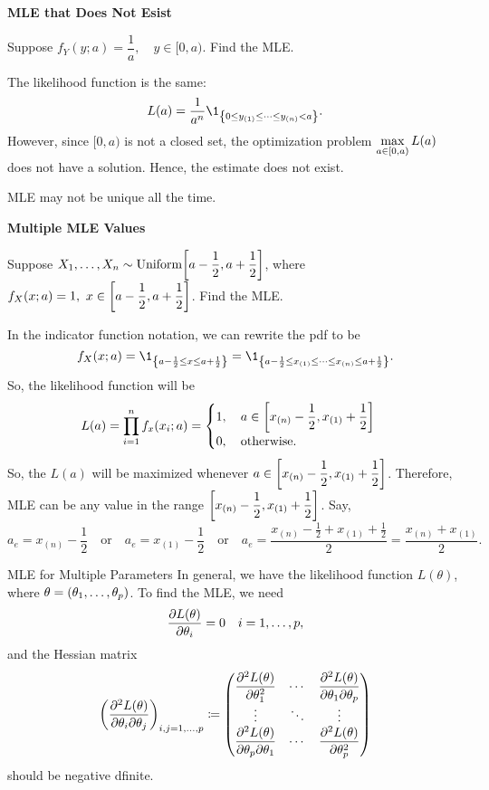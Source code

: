 \begin{eg}
	\textbf{MLE that Does Not Esist}
	\par Suppose $f_Y(y;a)=\dfrac{1}{a},\quad y\in[0, a)$. Find the MLE.
	\begin{sol}
		The likelihood function is the same: \[L(a)=\dfrac{1}{a^n}\1_{\qty{0\leq y_{(1)}\leq\cdots\leq y_{(n)}<a}}.\] However, since $[0,a)$ is not a closed set, the optimization problem $\displaystyle\max_{a\in[0,a)}L(a)$ does not have a solution. Hence, the estimate does not exist. 
	\end{sol}
\end{eg}
\begin{rmk}
	MLE may not be unique all the time.	
\end{rmk}
\begin{eg}
	\textbf{Multiple MLE Values}
	\par Suppose  $X_1,\dots,X_n\sim\text{Uniform}\qty[a-\dfrac{1}{2},a+\dfrac{1}{2}]$, where $f_X(x;a)=1,\ x\in\qty[a-\dfrac{1}{2}, a+\dfrac{1}{2}]$. Find the MLE. 
	\begin{sol}
		In the indicator function notation, we can rewrite the pdf to be \[f_X(x;a)=\1_{\qty{a-\frac{1}{2}\leq x\leq a+\frac{1}{2}}}=\1_\qty{a-\frac{1}{2}\leq x_{(1)}\leq\cdots\leq x_{(n)}\leq a+\frac{1}{2}}.\] So, the likelihood function will be \[L(a)=\prod_{i=1}^nf_x(x_i;a)=\begin{cases}1,\quad a\in\qty[x_{(n)}-\dfrac{1}{2}, x_{(1)}+\dfrac{1}{2}]\\0,\quad \text{otherwise}.\end{cases}\] So, the $L(a)$ will be maximized whenever $a\in\qty[x_{(n)}-\dfrac{1}{2}, x_{(1)}+\dfrac{1}{2}]$. Therefore, MLE can be any value in the range $\qty[x_{(n)}-\dfrac{1}{2}, x_{(1)}+\dfrac{1}{2}]$. Say, \[a_e=x_{(n)}-\dfrac{1}{2}\quad\text{or}\quad a_e=x_{(1)}-\frac{1}{2}\quad\text{or}\quad a_e=\dfrac{x_{(n)}-\frac{1}{2}+x_{(1)}+\frac{1}{2}}{2}=\dfrac{x_{(n)}+x_{(1)}}{2}.\]
	\end{sol}
\end{eg}
\begin{thm}{MLE for Multiple Parameters}
	In general, we have the likelihood function $L(\theta)$, where $\theta=\qty(\theta_1,\dots,\theta_p)$. To find the MLE, we need \[\pdv{L(\theta)}{\theta_i}=0\quad i=1,\dots,p,\] and the Hessian matrix \[\mqty(\dsst\pdv[2]{L(\theta)}{\theta_i}{\theta_j})_{i,j=1,\dots,p}\coloneqq\mqty(\dsst\pdv[2]{L(\theta)}{\theta_1}&\cdots&\dsst\pdv[2]{L(\theta)}{\theta_1}{\theta_p}\\\vdots&\ddots&\vdots\\\dsst\pdv[2]{L(\theta)}{\theta_p}{\theta_1}&\cdots&\dsst\pdv[2]{L(\theta)}{\theta_p})\] should be negative dfinite. 
\end{thm}
